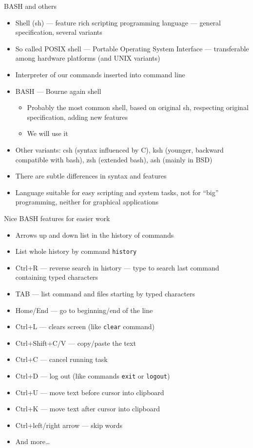 \documentclass[hyperref={bookmarks=true, unicode=true, colorlinks=true, pdftitle={Linux, command line and MetaCentrum}, plainpages=false, pdfauthor={Vojtech Zeisek}, pdfsubject={Course about use of Linux command line, writing shell scripts and using MetaCentrum of CESNET}, pdfcreator={XeLaTeX, http://www.xelatex.org/}, pdfkeywords={Linux, GNU, BASH, shell, command line, MetaCentrum}, linkcolor=Sienna, anchorcolor=black, citecolor=green, filecolor=magenta, menucolor=Sienna, urlcolor=cyan, pdftex}, compress, ucs, xelatex, xcolor=svgnames, 11pt]{beamer}
\begin{document}
\begin{frame}{BASH and others}
\begin{itemize}
  \item Shell (sh) --- feature rich scripting programming language --- general specification, several variants
  \item So called POSIX shell --- Portable Operating System Interface --- transferable among hardware platforms (and UNIX variants)
  \item Interpreter of our commands inserted into command line
  \item BASH --- Bourne again shell
  \begin{itemize}
    \item Probably the most common shell, based on original sh, respecting original specification, adding new features
    \item We will use it
  \end{itemize}
  \item Other variants: csh (syntax influenced by C), ksh (younger, backward compatible with bash), zsh (extended bash), ash (mainly in BSD)
  \item There are subtle differences in syntax and features
  \item Language suitable for easy scripting and system tasks, not for ``big'' programming, neither for graphical applications
\end{itemize}
\end{frame}

\begin{frame}{Nice BASH features for easier work}
\begin{itemize}
  \item Arrows up and down list in the history of commands
  \item List whole history by command \texttt{history}
  \item Ctrl+R --- reverse search in history --- type to search last command containing typed characters
  \item TAB --- list command and files starting by typed characters
  \item Home/End --- go to beginning/end of the line
  \item Ctrl+L --- clears screen (like \texttt{clear} command)
  \item Ctrl+Shift+C/V --- copy/paste the text
  \item Ctrl+C --- cancel running task
  \item Ctrl+D --- log out (like commands \texttt{exit} or \texttt{logout})
  \item Ctrl+U --- move text before cursor into clipboard
  \item Ctrl+K --- move text after cursor into clipboard
  \item Ctrl+left/right arrow --- skip words
  \item And more\ldots
\end{itemize}
\end{frame}
\end{document}
